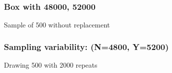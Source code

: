 \documentclass[handout]{beamer}
\begin{document}


   \begin{frame}
   \frametitle{Box with {\color{red} 48000}, {\color{blue} 52000}}
   \begin{center}
   \end{center}
   Sample of 500 without replacement
   \end{frame}



   \begin{frame}
   \frametitle{Sampling variability: (N=4800, Y=5200)}
   \begin{center}
   \end{center}
   Drawing 500 with 2000 repeats
   \end{frame}
\end{document}
